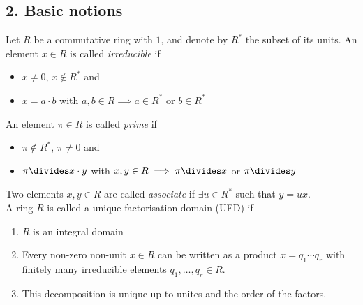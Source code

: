 \documentclass[NumTh.tex]{subfiles}
\begin{document}
\subsection{2. Basic notions}

Let $R$ be a commutative ring with $1$,
and denote by $R^\ast$ the subset of its units.
An element $x \in R$ is called \emph{irreducible} if
\begin{itemize}
  \item $x \neq 0$, $x \nin R^\ast$ and
  \item $x = a \cdot b$ with $a,b \in R \implies a \in R^\ast$ or $b \in R^\ast$
\end{itemize}
An element $\pi \in R$ is called \emph{prime} if
\begin{itemize}
  \item $\pi \nin R^\ast$, $\pi \neq 0$ and
  \item $\pi \divides x \cdot y$ with $x,y \in R \implies \pi \divides x$ or $\pi \divides y$
\end{itemize}
Two elements $x,y \in R$ are called \emph{associate} if $\exists u \in R^\ast$ such that $y = ux$.
\\

A ring $R$ is called a unique factorisation domain (UFD) if
\begin{enumerate}
  \item $R$ is an integral domain
  \item Every non-zero non-unit $x \in R$ can be written as a product $x = q_1 \cdots q_r$ with finitely many irreducible elements $q_1,\dots,q_r \in R$.
  \item This decomposition is unique up to unites and the order of the factors.
\end{enumerate}
\end{document}
